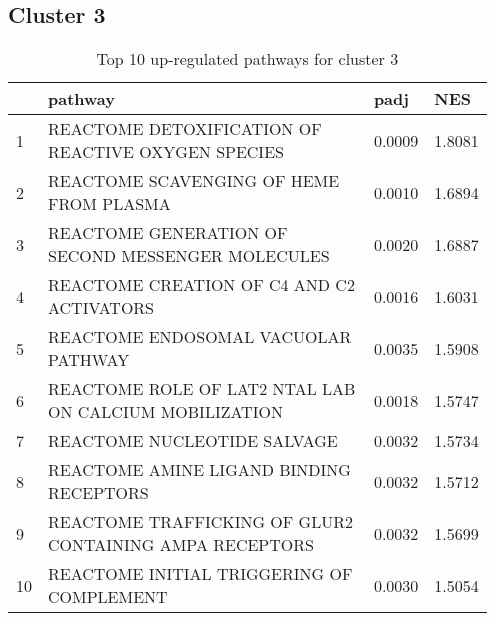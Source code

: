 \documentclass{article}
\begin{document}
\subsection{Cluster 3 }
\begin{table}[H]
\centering
\begin{tabular}{p{0.05\linewidth}p{0.7\linewidth}p{0.1\linewidth}p{0.1\linewidth}}
  \hline
 & pathway & padj & NES \\ 
  \hline
1 & REACTOME DETOXIFICATION OF REACTIVE OXYGEN SPECIES & 0.0009 & 1.8081 \\ 
  2 & REACTOME SCAVENGING OF HEME FROM PLASMA & 0.0010 & 1.6894 \\ 
  3 & REACTOME GENERATION OF SECOND MESSENGER MOLECULES & 0.0020 & 1.6887 \\ 
  4 & REACTOME CREATION OF C4 AND C2 ACTIVATORS & 0.0016 & 1.6031 \\ 
  5 & REACTOME ENDOSOMAL VACUOLAR PATHWAY & 0.0035 & 1.5908 \\ 
  6 & REACTOME ROLE OF LAT2 NTAL LAB ON CALCIUM MOBILIZATION & 0.0018 & 1.5747 \\ 
  7 & REACTOME NUCLEOTIDE SALVAGE & 0.0032 & 1.5734 \\ 
  8 & REACTOME AMINE LIGAND BINDING RECEPTORS & 0.0032 & 1.5712 \\ 
  9 & REACTOME TRAFFICKING OF GLUR2 CONTAINING AMPA RECEPTORS & 0.0032 & 1.5699 \\ 
  10 & REACTOME INITIAL TRIGGERING OF COMPLEMENT & 0.0030 & 1.5054 \\ 
   \hline
\end{tabular}
\caption{Top 10 up-regulated pathways for cluster 3} 
\label{tab:q3_2_3}
\end{table}
\end{document}
